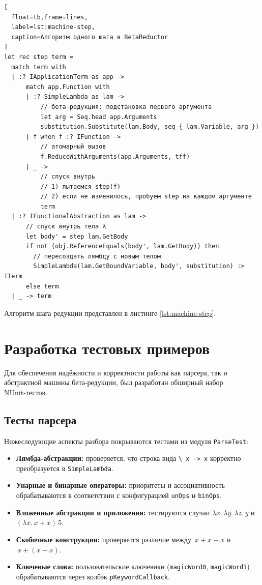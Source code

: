 \begin{itemize}
\begin{lstlisting}[
  float=tb,frame=lines,
  label=lst:machine-step,
  caption=Алгоритм одного шага в BetaReductor
]
let rec step term =
  match term with
  | :? IApplicationTerm as app ->
      match app.Function with
      | :? SimpleLambda as lam ->
          // бета-редукция: подстановка первого аргумента
          let arg = Seq.head app.Arguments
          substitution.Substitute(lam.Body, seq { lam.Variable, arg })
      | f when f :? IFunction ->
          // атомарный вызов
          f.ReduceWithArguments(app.Arguments, tff)
      | _ ->
          // спуск внутрь
          // 1) пытаемся step(f)
          // 2) если не изменилось, пробуем step на каждом аргументе
          term
  | :? IFunctionalAbstraction as lam ->
      // спуск внутрь тела λ
      let body' = step lam.GetBody
      if not (obj.ReferenceEquals(body', lam.GetBody)) then
        // пересоздать лямбду с новым телом
        SimpleLambda(lam.GetBoundVariable, body', substitution) :> ITerm
      else term
  | _ -> term
\end{lstlisting}

Алгоритм шага редукции представлен в листинге \ref{lst:machine-step}.

\section{Разработка тестовых примеров}
\label{sec:test-examples}

Для обеспечения надёжности и корректности работы как парсера, так и абстрактной машины бета‑редукции, был разработан обширный набор NUnit‑тестов.

\subsection{Тесты парсера}

Нижеследующие аспекты разбора покрываются тестами из модуля \texttt{ParseTest}:

\begin{itemize}
  \item \textbf{Лямбда‑абстракции:} проверяется, что строка вида \verb|\ x -> x| корректно преобразуется в \texttt{SimpleLambda}.  
  \item \textbf{Унарные и бинарные операторы:} приоритеты и ассоциативность обрабатываются в соответствии с конфигурацией \texttt{unOps} и \texttt{binOps}.  
  \\
  \item \textbf{Вложенные абстракции и приложения:} тестируются случаи \(\lambda x.\,\lambda y.\,\lambda z.\,y\) и \((\lambda x.\,x+x)\,5\).  
  \item \textbf{Скобочные конструкции:} проверяется различие между \(\,x + x - x\) и \(\,x + (x - x)\).  
  \item \textbf{Ключевые слова:} пользовательские ключевики (\texttt{magicWord0}, \texttt{magicWord1}) обрабатываются через колбэк \texttt{pKeywordCallback}.  
\end{itemize}


\end{itemize}
